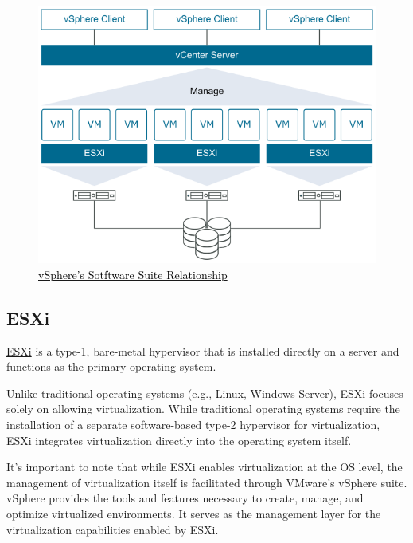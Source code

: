 \begin{figure}[H]
    \centering
    \includegraphics[scale = 0.75]{images/vmware-infrastructure-relationship.png}
    \caption{\href{https://docs.vmware.com/en/VMware-vSphere/index.html}{\textcolor{black}{vSphere's Sotftware Suite Relationship}}}
    \label{VMware}
\end{figure}

\subsection{ESXi}
\href{https://www.vmware.com/products/esxi-and-esx.html}{ESXi} is a type-1, bare-metal hypervisor that is installed directly on a server and functions as the primary operating system. 

Unlike traditional operating systems (e.g., Linux, Windows Server), ESXi focuses solely on allowing virtualization. While traditional operating systems require the installation of a separate software-based type-2 hypervisor for virtualization, ESXi integrates virtualization directly into the operating system itself.

It's important to note that while ESXi enables virtualization at the OS level, the management of virtualization itself is facilitated through VMware's vSphere suite. vSphere provides the tools and features necessary to create, manage, and optimize virtualized environments. It serves as the management layer for the virtualization capabilities enabled by ESXi.

